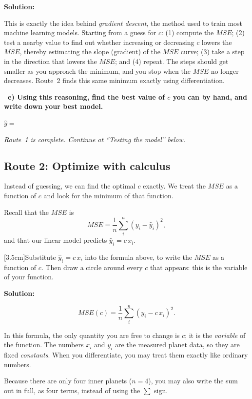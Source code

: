 \documentclass[12pt]{article}
\makeatletter
\newcounter{question}
\newlength\questionheight
\newcommand{\question}{\@ifstar{\question@text}{\question@field}}
\newcommand{\question@heading}[1]{%
  \refstepcounter{question}%
  \vspace{0.3cm}%
  \noindent\textbf{\faEdit\ Question \thequestion: #1}%
}
\newcommand{\question@text}[1]{%
  \question@heading{#1}%
}
\newcommand{\question@field}[2][\questionheight]{%
  \question@heading{#2}%
 \\[0.3em] \begin{Form}
    \TextField[
      name=Q\thequestion,
      multiline=true,
      width=\linewidth,
      height=#1,
      charsize=10pt,
      bordercolor={0 0 0},
      borderwidth=1.8,
      backgroundcolor={1 1 1}
    ]{}
  \end{Form}
  \vspace{0.3cm}%
}
\newenvironment{solution}{%
  \begin{solutionbox}\textbf{Solution:}
}{%
  \end{solutionbox}
}
\newcounter{answerfield}
\newcommand{\answerbox}[2][3cm]{%
  \refstepcounter{answerfield}%
  #2~\begin{Form}\TextField[
      name=F\theanswerfield,
      multiline=false,
      width=#1,
      height=1.1em,
      charsize=10pt,
      bordercolor={0 0 0},
      borderwidth=1,
      backgroundcolor={1 1 1}
    ]{}\end{Form}%
}
\makeatother
\begin{document}
\begin{solution}
This is exactly the idea behind \emph{gradient descent}, the method used to train most machine learning models. Starting from a guess for $c$: (1) compute the $MSE$; (2) test a nearby value to find out whether increasing or decreasing $c$ lowers the $MSE$, thereby estimating the slope (gradient) of the $MSE$ curve; (3) take a step in the direction that lowers the $MSE$; and (4) repeat. The steps should get smaller as you approach the minimum, and you stop when the $MSE$ no longer decreases. Route~2 finds this same minimum exactly using differentiation.
\end{solution}

\textcolor{maincolor}{\textbf{\faPen\ e) Using this reasoning, find the best value of $c$ you can by hand, and write down your best model.}}

\answerbox[5cm]{$\hat{y} ={}$}

\medskip
\emph{Route~1 is complete. Continue at ``Testing the model'' below.}

\subsection*{Route 2: Optimize with calculus}

Instead of guessing, we can find the optimal $c$ exactly. We treat the $MSE$ as a function of $c$ and look for the minimum of that function.

Recall that the $MSE$ is
$$MSE = \frac{1}{n}\sum_i^n (y_i - \hat{y}_i)^2,$$
and that our linear model predicts $\hat{y}_i = c\,x_i$.

\question[3.5cm]{Substitute $\hat{y}_i = c\,x_i$ into the formula above, to write the $MSE$ as a function of $c$. Then draw a circle around every $c$ that appears: this is the variable of your function.}

\begin{solution}
$$MSE(c) = \frac{1}{n}\sum_i^n (y_i - c\,x_i)^2.$$
\end{solution}

\begin{importantbox}
In this formula, the only quantity you are free to change is $c$; it is the \emph{variable} of the function. The numbers $x_i$ and $y_i$ are the measured planet data, so they are fixed \emph{constants}. When you differentiate, you may treat them exactly like ordinary numbers.

Because there are only four inner planets ($n = 4$), you may also write the sum out in full, as four terms, instead of using the $\sum$ sign.
\end{importantbox}
\end{document}
